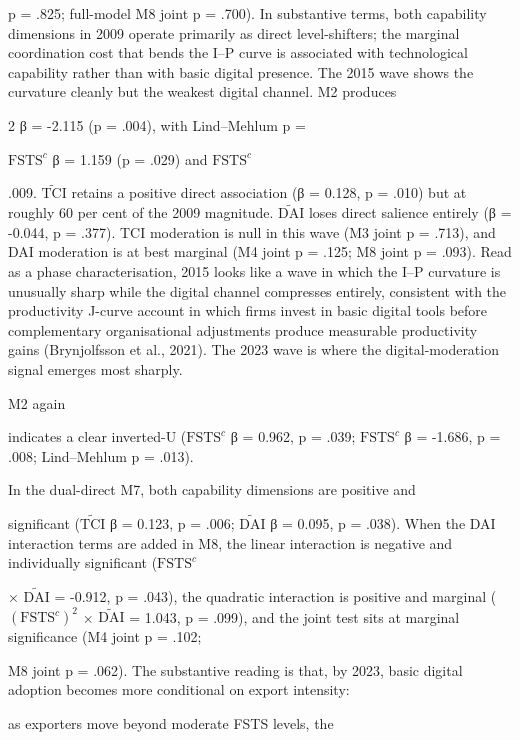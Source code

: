 \documentclass[12pt,a4paper]{article}
\begin{document}
p = .825; full-model M8 joint p = .700). In substantive terms, both
capability dimensions in 2009 operate primarily as direct
level-shifters; the marginal coordination cost that bends the I--P curve
is associated with technological capability rather than with basic
digital presence. The 2015 wave shows the curvature cleanly but the
weakest digital channel. M2 produces

2 β = -2.115 (p = .004), with Lind--Mehlum p =

\(\mathrm{FSTS}^{c}\) β = 1.159 (p = .029) and \(\mathrm{FSTS}^{c}\)

.009. \(\tilde{\mathrm{TCI}}\) retains a positive direct association (β
= 0.128, p = .010) but at roughly 60 per cent of the 2009 magnitude.
\(\tilde{\mathrm{DAI}}\) loses direct salience entirely (β = -0.044, p =
.377). TCI moderation is null in this wave (M3 joint p = .713), and DAI
moderation is at best marginal (M4 joint p = .125; M8 joint p = .093).
Read as a phase characterisation, 2015 looks like a wave in which the
I--P curvature is unusually sharp while the digital channel compresses
entirely, consistent with the productivity J-curve account in which
firms invest in basic digital tools before complementary organisational
adjustments produce measurable productivity gains (Brynjolfsson et al.,
2021). The 2023 wave is where the digital-moderation signal emerges most
sharply.

M2 again

indicates a clear inverted-U (\(\mathrm{FSTS}^{c}\) β = 0.962, p = .039;
\(\mathrm{FSTS}^{c}\) β = -1.686, p = .008; Lind--Mehlum p = .013).

In the dual-direct M7, both capability dimensions are positive and

significant (\(\tilde{\mathrm{TCI}}\) β = 0.123, p = .006;
\(\tilde{\mathrm{DAI}}\) β = 0.095, p = .038). When the DAI interaction
terms are added in M8, the linear interaction is negative and
individually significant (\(\mathrm{FSTS}^{c}\)

× \(\tilde{\mathrm{DAI}}\) = -0.912, p = .043), the quadratic
interaction is positive and marginal (\((\mathrm{FSTS}^{c})^2\) ×
\(\tilde{\mathrm{DAI}}\) = 1.043, p = .099), and the joint test sits at
marginal significance (M4 joint p = .102;

M8 joint p = .062). The substantive reading is that, by 2023, basic
digital adoption becomes more conditional on export intensity:

as exporters move beyond moderate FSTS levels, the
\end{document}
